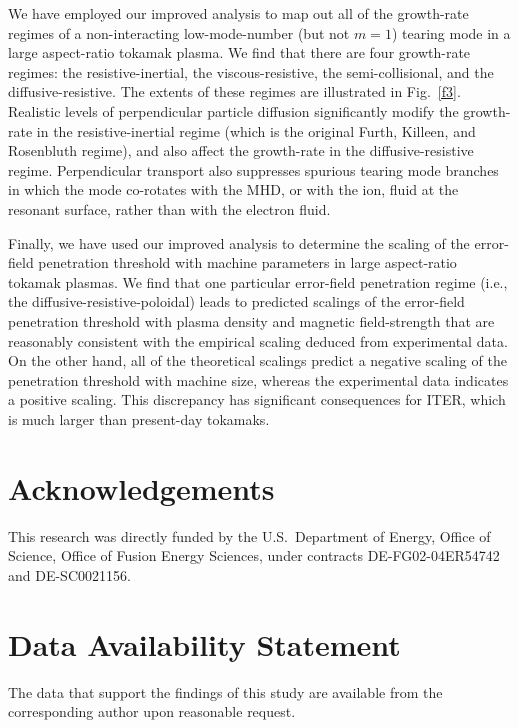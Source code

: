 \documentclass[12pt,prb,aps]{revtex4-1}
\begin{document}
We have employed our improved analysis to map out all of the growth-rate regimes of a non-interacting low-mode-number
(but not $m=1$) tearing mode in a large aspect-ratio tokamak plasma. We find that there are four growth-rate regimes:
the resistive-inertial, the viscous-resistive, the semi-collisional, and the diffusive-resistive. The extents of these regimes are illustrated in Fig.~\ref{f3}. 
Realistic levels of perpendicular particle diffusion significantly modify the growth-rate in the resistive-inertial
regime (which is the original Furth, Killeen, and Rosenbluth regime), and also affect the growth-rate in the diffusive-resistive regime. 
Perpendicular transport also suppresses spurious tearing mode branches in which the mode co-rotates with the MHD, or with the ion,
fluid at the resonant surface, rather than with the electron fluid. 

Finally, we have used our improved analysis to determine the scaling of the error-field penetration threshold with machine parameters in 
large aspect-ratio tokamak plasmas. We find that one particular error-field penetration regime (i.e., the diffusive-resistive-poloidal)
leads to predicted scalings of the error-field penetration threshold with plasma density and magnetic field-strength
that are reasonably consistent with the empirical scaling deduced from experimental data. On the other hand,
all of the theoretical scalings predict a negative scaling of the penetration threshold with machine size, 
whereas the experimental data indicates a positive scaling. This discrepancy has
significant consequences for ITER, which is much larger than present-day tokamaks.

\section*{Acknowledgements}
This research was directly funded by the U.S.\ Department of Energy, Office of Science, Office of Fusion Energy Sciences,  under  contracts DE-FG02-04ER54742 and DE-SC0021156. 

\section*{Data Availability Statement}
The data that support the findings of this study are available from the corresponding author upon reasonable request.
\end{document}
